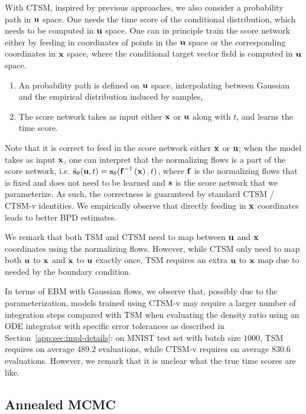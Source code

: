 With CTSM, inspired by previous approaches, we also consider a probability path in $\operatorname{\mathbf{u}}$ space. One needs the time score of the conditional distribution, which needs to be computed in $\operatorname{\mathbf{u}}$ space. One can in principle train the score network either by feeding in coordinates of points in the $\operatorname{\mathbf{u}}$ space or the corresponding coordinates in $\operatorname{\mathbf{x}}$ space, where the conditional target vector field is computed in $\operatorname{\mathbf{u}}$ space.

\begin{enumerate}
\item An probability path is defined on $\operatorname{\mathbf{u}}$ space, interpolating between Gaussian and the empirical distribution induced by samples,
\item The score network takes as input either $\operatorname{\mathbf{x}}$ or $\operatorname{\mathbf{u}}$ along with $t$, and learns the time score.
\end{enumerate}

Note that it is correct to feed in the score network either $\operatorname{\mathbf{x}}$ or $\operatorname{\mathbf{u}}$; when the model takes as input $\operatorname{\mathbf{x}}$, one can interpret that the normalizing flows is a part of the score network, i.e. $\tilde{\operatorname{\mathbf{s}}}_{\operatorname{\mathbf{\theta}}}(\operatorname{\mathbf{u}},t) = \operatorname{\mathbf{s}}_{\operatorname{\mathbf{\theta}}}(\operatorname{\mathbf{f}}^{-1}\left(\operatorname{\mathbf{x}}\right),t)$, where $\operatorname{\mathbf{f}}$ is the normalizing flows that is fixed and does not need to be learned and $\operatorname{\mathbf{s}}$ is the score network that we parameterize. As such, the correctness is guaranteed by standard CTSM / CTSM-v identities. We empirically observe that directly feeding in $\operatorname{\mathbf{x}}$ coordinates leads to better BPD estimates. 

We remark that both TSM and CTSM need to map between $\operatorname{\mathbf{u}}$ and $\operatorname{\mathbf{x}}$ coordinates using the normalizing flows. However, while CTSM only need to map both $\operatorname{\mathbf{u}}$ to $\operatorname{\mathbf{x}}$ and $\operatorname{\mathbf{x}}$ to $\operatorname{\mathbf{u}}$ exactly once, TSM requires an extra $\operatorname{\mathbf{u}}$ to $\operatorname{\mathbf{x}}$ map due to needed by the boundary condition.

In terms of EBM with Gaussian flows, we observe that, possibly due to the parameterization, models trained using CTSM-v may require a larger number of integration steps compared with TSM when evaluating the density ratio using an ODE integrator with specific error tolerances as described in Section~\ref{app:sec:impl-details}: on MNIST test set with batch size $1000$, TSM requires on average $489.2$ evaluations, while CTSM-v requires on average $830.6$ evaluations. However, we remark that it is unclear what the true time scores are like.

\subsection{Annealed MCMC}

